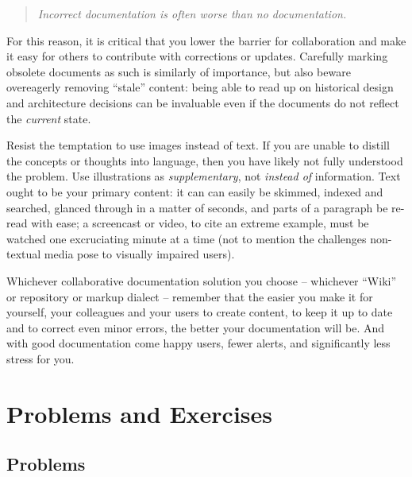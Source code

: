 \begin{quote}
{\em Incorrect documentation is often worse than no documentation.}
\end{quote}

For this reason, it is critical that you lower the
barrier for collaboration and make it easy for others
to contribute with corrections or updates.  Carefully
marking obsolete documents as such is similarly of
importance, but also beware overeagerly removing
``stale'' content: being able to read up on historical
design and architecture decisions can be invaluable
even if the documents do not reflect the {\em current}
state.

Resist the temptation to use images instead of text.
If you are unable to distill the concepts or thoughts
into language, then you have likely not fully
understood the problem.  Use illustrations as {\em
supplementary}, not {\em instead of} information.
Text ought to be your primary content: it can can
easily be skimmed, indexed and searched, glanced
through in a matter of seconds, and parts of a
paragraph be re-read with ease; a screencast or video,
to cite an extreme example, must be watched one
excruciating minute at a time (not to mention the
challenges non-textual media pose to visually impaired
users).

Whichever collaborative documentation solution you
choose -- whichever ``Wiki'' or repository
or markup dialect -- remember that the easier you make
it for yourself, your colleagues and your users to
create content, to keep it up to date and to correct
even minor errors, the better your documentation will
be.  And with good documentation come happy users,
fewer alerts, and significantly less stress for you.

\vfill
\pagebreak

\chapter*{Problems and Exercises}
\section*{Problems}

